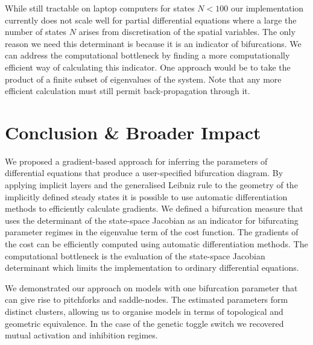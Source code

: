 \documentclass{article}
\begin{document}
While still tractable on laptop computers for states $N<100$ our implementation currently does not scale well for partial differential equations where a large the number of states $N$ arises from discretisation of the spatial variables. The only reason we need this determinant is because it is an indicator of bifurcations. We can address the computational bottleneck by finding a more computationally efficient way of calculating this indicator. One approach would be to take the product of a finite subset of eigenvalues of the system. Note that any more efficient calculation must still permit back-propagation through it.

\section{Conclusion \& Broader Impact}
\label{section:conclusion}

We proposed a gradient-based approach for inferring the parameters of differential equations that produce a user-specified bifurcation diagram. By applying implicit layers \cite{Look2020DifferentiableLayers,Bai2019DeepModels} and the generalised Leibniz rule \cite{Flanders1973DifferentiationSign} to the geometry of the implicitly defined steady states \cite{Goldman2005CurvatureSurfaces} it is possible to use automatic differentiation methods to efficiently calculate gradients. We defined a bifurcation measure that uses the determinant of the state-space Jacobian as an indicator for bifurcating parameter regimes in the eigenvalue term of the cost function. The gradients of the cost can be efficiently computed using automatic differentiation methods. The computational bottleneck is the evaluation of the state-space Jacobian determinant which limits the implementation to ordinary differential equations.

We demonstrated our approach on models with one bifurcation parameter that can give rise to pitchforks and saddle-nodes. The estimated parameters form distinct clusters, allowing us to organise models in terms of topological and geometric equivalence. In the case of the genetic toggle switch we recovered mutual activation and inhibition regimes.
\end{document}
